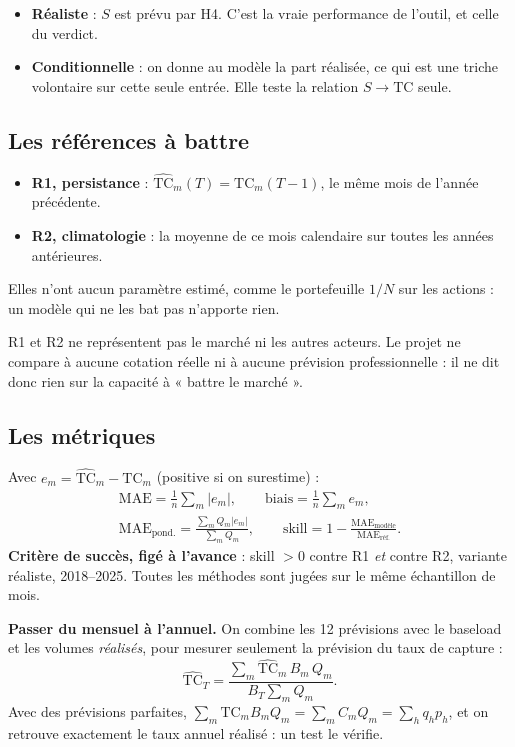 \documentclass[11pt,a4paper]{article}
\newcommand{\TC}{\mathrm{TC}}
\newcommand{\MAE}{\mathrm{MAE}}
\begin{document}
\begin{itemize}
\item \textbf{Réaliste} : $S$ est prévu par H4. C'est la vraie performance de l'outil, et celle du verdict.
\item \textbf{Conditionnelle} : on donne au modèle la part réalisée, ce qui est une triche volontaire sur cette seule entrée. Elle teste la relation $S \to \TC$ seule.
\end{itemize}

\subsection{Les références à battre}

\begin{itemize}
\item \textbf{R1, persistance} : $\widehat{\TC}_m(T) = \TC_m(T-1)$, le même mois de l'année précédente.
\item \textbf{R2, climatologie} : la moyenne de ce mois calendaire sur toutes les années antérieures.
\end{itemize}

Elles n'ont aucun paramètre estimé, comme le portefeuille $1/N$ sur les actions : un modèle qui ne les bat pas n'apporte rien.

\begin{attention}
R1 et R2 ne représentent pas le marché ni les autres acteurs. Le projet ne compare à aucune cotation réelle ni à aucune prévision professionnelle : il ne dit donc rien sur la capacité à « battre le marché ».
\end{attention}

\subsection{Les métriques}

Avec $e_m = \widehat{\TC}_m - \TC_m$ (positive si on surestime) :
\begin{gather*}
\MAE = \frac1n\sum_m |e_m|,
\qquad
\text{biais} = \frac1n\sum_m e_m,
\\
\MAE_{\text{pond.}} = \frac{\sum_m Q_m |e_m|}{\sum_m Q_m},
\qquad
\text{skill} = 1 - \frac{\MAE_{\text{modèle}}}{\MAE_{\text{réf.}}}.
\end{gather*}
\textbf{Critère de succès, figé à l'avance} : skill $> 0$ contre R1 \emph{et} contre R2, variante réaliste, 2018--2025. Toutes les méthodes sont jugées sur le même échantillon de mois.

\textbf{Passer du mensuel à l'annuel.} On combine les 12 prévisions avec le baseload et les volumes \emph{réalisés}, pour mesurer seulement la prévision du taux de capture :
\[
\widehat{\TC}_T = \frac{\sum_m \widehat{\TC}_m\, B_m\, Q_m}{B_T \sum_m Q_m}.
\]
Avec des prévisions parfaites, $\sum_m \TC_m B_m Q_m = \sum_m C_m Q_m = \sum_h q_h p_h$, et on retrouve exactement le taux annuel réalisé : un test le vérifie.
\end{document}
